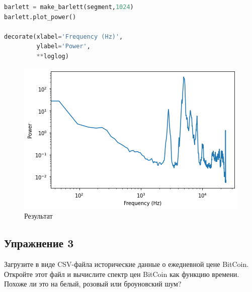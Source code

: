 \begin{lstlisting}[language=Python]
barlett = make_barlett(segment,1024)
barlett.plot_power()

decorate(xlabel='Frequency (Hz)', 
         ylabel='Power', 
         **loglog)
\end{lstlisting}
\begin{figure}[H]
	\begin{center}
		\includegraphics[scale=1]{fig/lab04/lab04_23_0.png}
		\caption{Результат}
	\end{center}
\end{figure}


\subsection{Упражнение 3}

Загрузите в виде CSV-файла исторические данные о ежедневной цене BitCoin. Откройте этот файл и вычислите спектр цен BitCoin как функцию времени. Похоже ли это на белый, розовый или броуновский шум?


